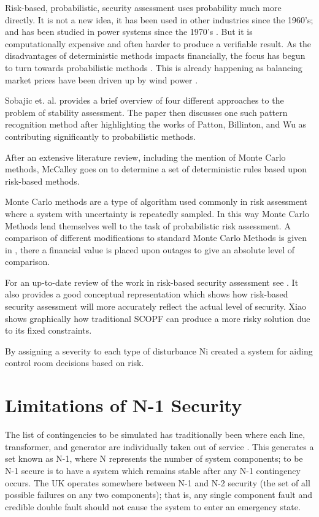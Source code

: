 \documentclass[a4paper,oneside,12pt]{report}
\begin{document}
Risk-based, probabilistic, security assessment uses probability much more directly. It is not a new idea, it has been used in other industries since the 1960's; and has been studied in power systems since the 1970's \cite{Patton1972}. But it is computationally expensive and often harder to produce a verifiable result. As the disadvantages of deterministic methods impacts financially, the focus has begun to turn towards probabilistic methods \cite{McCalley1999, Kirschen2002}. This is already happening as balancing market prices have been driven up by wind power \cite{BWEA2005}.

Sobajic et. al. \cite{Sobajic1989} provides a brief overview of four different approaches to the problem of stability assessment. The paper then discusses one such pattern recognition method after highlighting the works of Patton, Billinton, and Wu as contributing significantly to probabilistic methods.

After an extensive literature review, including the mention of Monte Carlo methods, McCalley \cite{McCalley1997} goes on to determine a set of deterministic rules based upon risk-based methods.

Monte Carlo methods are a type of algorithm used commonly in risk assessment where a system with uncertainty is repeatedly sampled. In this way Monte Carlo Methods lend themselves well to the task of probabilistic risk assessment. A comparison of different modifications to standard Monte Carlo Methods is given in \cite{Bell1999}, there a financial value is placed upon outages to give an absolute level of comparison.

For an up-to-date review of the work in risk-based security assessment see \cite{Kirschen2007}. It also provides a good conceptual representation which shows how risk-based security assessment will more accurately reflect the actual level of security. Xiao \cite{Xiao2007} shows graphically how traditional SCOPF can produce a more risky solution due to its fixed constraints.

By assigning a severity to each type of disturbance Ni \cite{Ni2003} created a system for aiding control room decisions based on risk.

\section{Limitations of N-1 Security}

The list of contingencies to be simulated has traditionally been where each line, transformer, and generator are individually taken out of service \cite{Kirschen2007}. This generates a set known as N-1, where N represents the number of system components; to be N-1 secure is to have a system which remains stable after any N-1 contingency occurs. The UK operates somewhere between N-1 and N-2 security (the set of all possible failures on any two components); that is, any single component fault and credible double fault should not cause the system to enter an emergency state.
\end{document}
